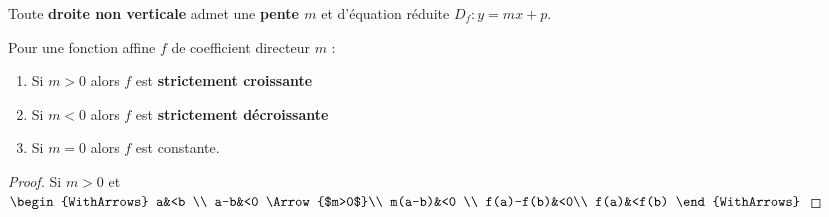 \documentclass[main.tex]{subfiles}
\begin{document}
\begin{property}  Toute \textbf{droite non verticale} admet une \textbf{pente $m$} et d'équation réduite $D_f\colon y=mx+p$. 
\end{property} 
\begin{property} Pour une fonction affine $f$ de coefficient directeur $m$ :
	\begin{enumerate}[label=\textbullet, leftmargin=*]
		\item Si $m>0$ alors $f$ est \textbf{strictement croissante}
		\item Si $m<0$ alors $f$ est \textbf{strictement décroissante}
		\item Si $m=0$ alors $f$ est constante.
	\end{enumerate}  
\end{property} 
\begin{proof} \color{white} Si $m>0$  et
	$\begin{WithArrows}
		a&<b \\
		a-b&<0 \Arrow{$m>0$}\\
		m(a-b)&<0 \\
		f(a)-f(b)&<0\\
		f(a)&<f(b)
	\end{WithArrows}$ 
\end{proof}
\end{document}
